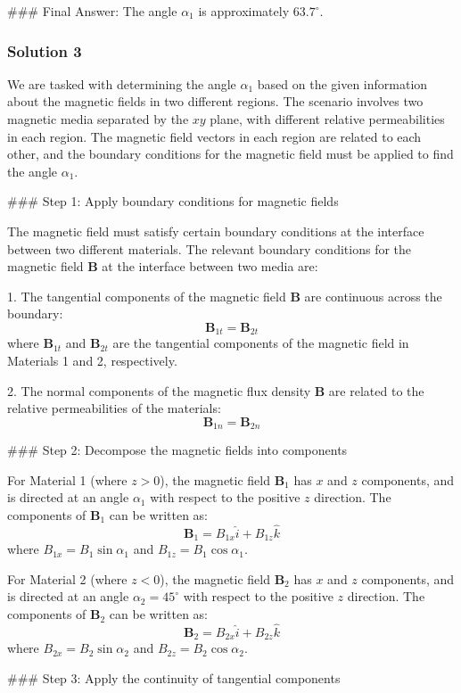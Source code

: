 \documentclass{article}
\begin{document}
### Final Answer:
The angle $\alpha_1$ is approximately $63.7^\circ$.


\subsubsection{Solution 3}
We are tasked with determining the angle $\alpha_1$ based on the given information about the magnetic fields in two different regions. The scenario involves two magnetic media separated by the $xy$ plane, with different relative permeabilities in each region. The magnetic field vectors in each region are related to each other, and the boundary conditions for the magnetic field must be applied to find the angle $\alpha_1$.

### Step 1: Apply boundary conditions for magnetic fields

The magnetic field must satisfy certain boundary conditions at the interface between two different materials. The relevant boundary conditions for the magnetic field $\mathbf{B}$ at the interface between two media are:

1. The tangential components of the magnetic field $\mathbf{B}$ are continuous across the boundary:
\[
\mathbf{B}_{1t} = \mathbf{B}_{2t}
\]
where $\mathbf{B}_{1t}$ and $\mathbf{B}_{2t}$ are the tangential components of the magnetic field in Materials 1 and 2, respectively.

2. The normal components of the magnetic flux density $\mathbf{B}$ are related to the relative permeabilities of the materials:
\[
\mathbf{B}_{1n} = \mathbf{B}_{2n}
\]

### Step 2: Decompose the magnetic fields into components

For Material 1 (where $z > 0$), the magnetic field $\mathbf{B}_1$ has $x$ and $z$ components, and is directed at an angle $\alpha_1$ with respect to the positive $z$ direction. The components of $\mathbf{B}_1$ can be written as:
\[
\mathbf{B}_1 = B_{1x} \hat{i} + B_{1z} \hat{k}
\]
where $B_{1x} = B_1 \sin \alpha_1$ and $B_{1z} = B_1 \cos \alpha_1$.

For Material 2 (where $z < 0$), the magnetic field $\mathbf{B}_2$ has $x$ and $z$ components, and is directed at an angle $\alpha_2 = 45^\circ$ with respect to the positive $z$ direction. The components of $\mathbf{B}_2$ can be written as:
\[
\mathbf{B}_2 = B_{2x} \hat{i} + B_{2z} \hat{k}
\]
where $B_{2x} = B_2 \sin \alpha_2$ and $B_{2z} = B_2 \cos \alpha_2$.

### Step 3: Apply the continuity of tangential components
\end{document}
